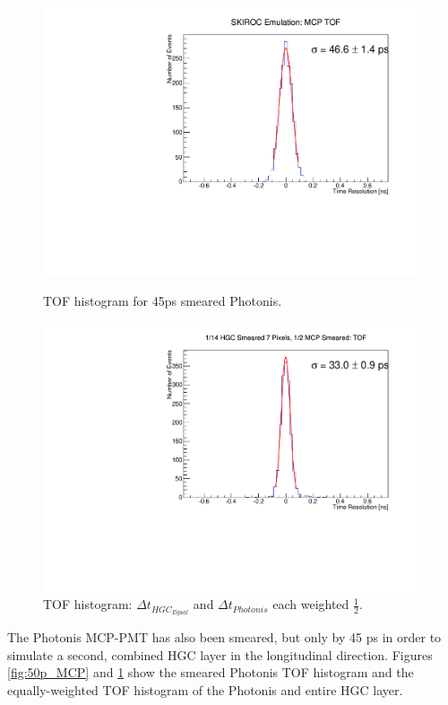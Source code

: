 \documentclass[twocolumn,aps,prd,reprint,superscriptaddress,floatfix]{revtex4-1}
\begin{document}
\begin{figure}[!htbp]
\centering
\begin{minipage}[t]{.49\textwidth}
	\centering
	\includegraphics[width=\linewidth]{deltaTMCPSmear50.pdf}
	\caption{TOF histogram for 45ps smeared Photonis.}
	\label{fig:50p_MCP}
\end{minipage}\hfill
\begin{minipage}[t]{.49\textwidth}
	\centering
	\includegraphics[width=\linewidth]{deltaT_PicoSilEqual_MCP_Equal_BothSmear50.pdf}
	\caption{TOF histogram: $\Delta t_{HGC_{Equal}}$ and $\Delta t_{Photonis}$ each weighted $\frac{1}{2}$.}
	\label{fig:50ps_HGCequal_MCP}
\end{minipage}
\end{figure}

The Photonis MCP-PMT has also been smeared, but only by 45 ps in order to simulate a second, combined HGC layer in the longitudinal direction. 
Figures \ref{fig:50p_MCP} and \ref{fig:50ps_HGCequal_MCP} show the smeared Photonis TOF histogram and the equally-weighted TOF histogram of the Photonis and entire HGC layer.
\end{document}
